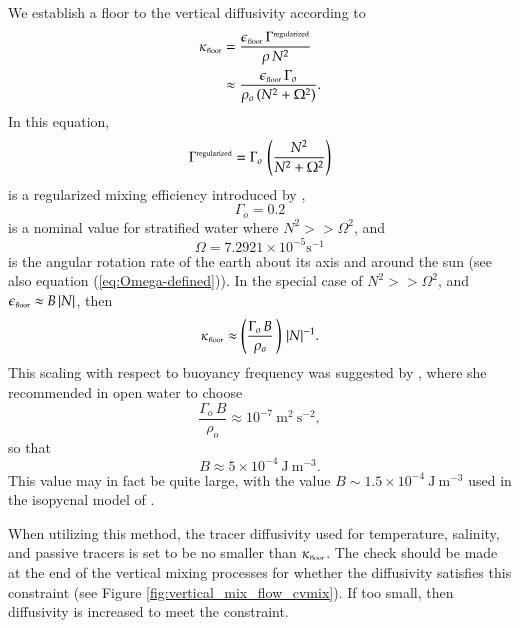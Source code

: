 We establish a floor to the vertical diffusivity according to
\begin{equation}
\begin{split}
  \kappa_{\mbox{\tiny floor}} &= \frac{ \epsilon_{\mbox{\tiny floor}}  \, \Gamma^{\mbox{\tiny regularized}}}{\rho \, N^{2}} 
  \\
 &\approx \frac{\epsilon_{\mbox{\tiny floor}} \, \Gamma_{o}  }{\rho_{o} \, (N^{2} + \Omega^{2})}.
\end{split}
\end{equation}
 In this equation, 
\begin{equation}
 \Gamma^{\mbox{\tiny regularized}} = \Gamma_{o} \,  \left( \frac{ N^{2}}{ N^{2} +\Omega^{2}} \right)
\end{equation}
is a regularized mixing efficiency introduced by
\cite{Melet_etal_2012},
\begin{equation}
 \Gamma_{o} = 0.2
\end{equation}
is a nominal value for stratified water where $N^{2} >> \Omega^{2}$,
and
\begin{equation}
 \Omega = 7.2921 \times 10^{-5} \mbox{s}^{-1}
\end{equation} 
is the angular rotation rate of the earth about its axis and around
the sun (see also equation (\ref{eq:Omega-defined})).  In the special
case of $N^{2} >> \Omega^{2}$, and $\epsilon_{\mbox{\tiny floor}}
\approx B \, |N|$, then
\begin{equation}
 \kappa_{\mbox{\tiny floor}} \approx \left( \frac{ \Gamma_{o} \,  B }{\rho_{o}} \, \right) \, |N|^{-1}.
\label{eq:gargett-scaling}
\end{equation} 
This scaling with respect to buoyancy frequency was suggested by
\cite{Gargett1984}, where she recommended in open water to choose
\begin{equation}
   \frac{ \Gamma_{o} \,  B }{\rho_{o}} \approx 10^{-7}~\mbox{m}^{2}~\mbox{s}^{-2},
\end{equation}
 so that 
\begin{equation}
 B \approx 5 \times  10^{-4}~\mbox{J}~\mbox{m}^{-3}.
\end{equation}
This value may in fact be quite large, with the value $B \sim 1.5
\times 10^{-4}~\mbox{J}~\mbox{m}^{-3}$ used in the isopycnal model of
\cite{Dunne_etal_part1_2012}.

When utilizing this method, the tracer diffusivity used for
temperature, salinity, and passive tracers is set to be no smaller
than $\kappa_{\mbox{\tiny floor}}$.  The check should be made at the
end of the vertical mixing processes for whether the diffusivity
satisfies this constraint (see Figure
\ref{fig:vertical_mix_flow_cvmix}).  If too small, then diffusivity is
increased to meet the constraint.
